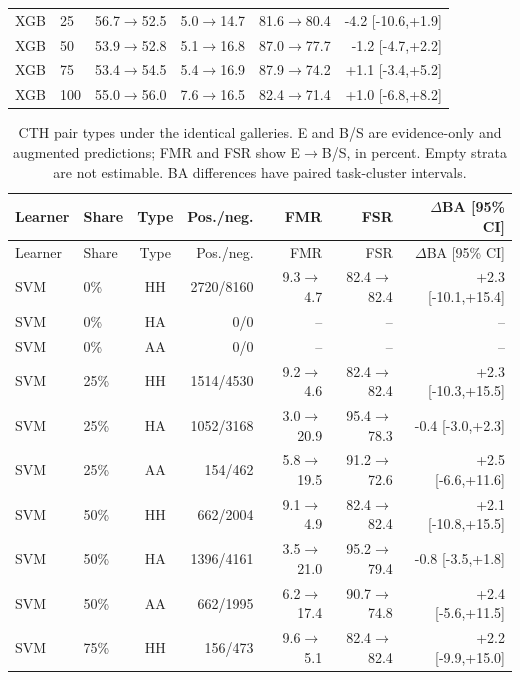 \begin{table}[ht]
\begin{tabular*}{\linewidth}{@{\extracolsep{\fill}}llrrrr@{}}
XGB & 25 & 56.7$\rightarrow$52.5 & 5.0$\rightarrow$14.7 & 81.6$\rightarrow$80.4 & -4.2 [-10.6,+1.9] \\
XGB & 50 & 53.9$\rightarrow$52.8 & 5.1$\rightarrow$16.8 & 87.0$\rightarrow$77.7 & -1.2 [-4.7,+2.2] \\
XGB & 75 & 53.4$\rightarrow$54.5 & 5.4$\rightarrow$16.9 & 87.9$\rightarrow$74.2 & +1.1 [-3.4,+5.2] \\
XGB & 100 & 55.0$\rightarrow$56.0 & 7.6$\rightarrow$16.5 & 82.4$\rightarrow$71.4 & +1.0 [-6.8,+8.2] \\
\bottomrule
\end{tabular*}
\end{table}



\begin{longtable}{@{}llcrrrr@{}}
\caption{CTH pair types under the identical galleries. E and B/S are evidence-only and augmented predictions; FMR and FSR show E$\rightarrow$B/S, in percent. Empty strata are not estimable. BA differences have paired task-cluster intervals.}\label{tab:matched-types}\\
\toprule Learner & Share & Type & Pos./neg. & FMR & FSR & $\Delta$BA [95\% CI] \\
\midrule\endfirsthead
\toprule Learner & Share & Type & Pos./neg. & FMR & FSR & $\Delta$BA [95\% CI] \\
\midrule\endhead
SVM & 0\% & HH & 2720/8160 & 9.3$\rightarrow$4.7 & 82.4$\rightarrow$82.4 & +2.3 [-10.1,+15.4] \\
SVM & 0\% & HA & 0/0 & -- & -- & -- \\
SVM & 0\% & AA & 0/0 & -- & -- & -- \\
SVM & 25\% & HH & 1514/4530 & 9.2$\rightarrow$4.6 & 82.4$\rightarrow$82.4 & +2.3 [-10.3,+15.5] \\
SVM & 25\% & HA & 1052/3168 & 3.0$\rightarrow$20.9 & 95.4$\rightarrow$78.3 & -0.4 [-3.0,+2.3] \\
SVM & 25\% & AA & 154/462 & 5.8$\rightarrow$19.5 & 91.2$\rightarrow$72.6 & +2.5 [-6.6,+11.6] \\
SVM & 50\% & HH & 662/2004 & 9.1$\rightarrow$4.9 & 82.4$\rightarrow$82.4 & +2.1 [-10.8,+15.5] \\
SVM & 50\% & HA & 1396/4161 & 3.5$\rightarrow$21.0 & 95.2$\rightarrow$79.4 & -0.8 [-3.5,+1.8] \\
SVM & 50\% & AA & 662/1995 & 6.2$\rightarrow$17.4 & 90.7$\rightarrow$74.8 & +2.4 [-5.6,+11.5] \\
SVM & 75\% & HH & 156/473 & 9.6$\rightarrow$5.1 & 82.4$\rightarrow$82.4 & +2.2 [-9.9,+15.0] \\

\end{longtable}
